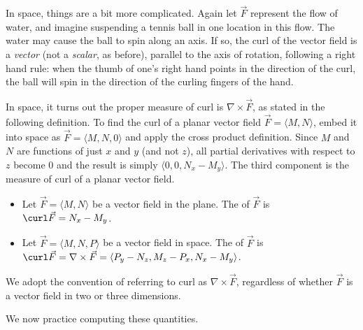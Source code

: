 In space, things are a bit more complicated. Again let $\vec F$ represent the flow of water, and imagine suspending a tennis ball in one location in this flow. The water may cause the ball to spin along an axis. If so, the curl of the vector field is a \emph{vector} (not a \emph{scalar}, as before), parallel to the axis of rotation, following a right hand rule: when the thumb of one's right hand points in the direction of the curl, the ball will spin in the direction of the curling fingers of the hand.

In space, it turns out the proper measure of curl is $\nabla \times \vec F$, as stated in the following definition. To find the curl of a planar vector field $\vec F = \langle M,N\rangle$, embed it into space as $\vec F = \langle M, N, 0\rangle$ and apply the cross product definition. Since $M$ and $N$ are functions of just $x$ and $y$ (and not $z$), all partial derivatives with respect to $z$ become 0 and the result is simply $\langle 0,0,N_x-M_y\rangle$. The third component is the measure of curl of a planar vector field. 

{\begin{itemize}
	\item Let $\vec F = \langle M,N\rangle$ be a vector field in the plane. The  of $\vec F$ is $\curl \vec F = N_x - M_y$.
	\item Let $\vec F = \langle M,N,P\rangle$ be a vector field in space. The  of $\vec F$ is $\curl \vec F = \nabla \times \vec F = \langle P_y-N_z,M_z-P_x,N_x - M_y\rangle$.
\end{itemize}
}

We adopt the convention of referring to curl as $\nabla \times \vec F$, regardless of whether $\vec F$ is a vector field in two or three dimensions. 

We now practice computing these quantities.\\

